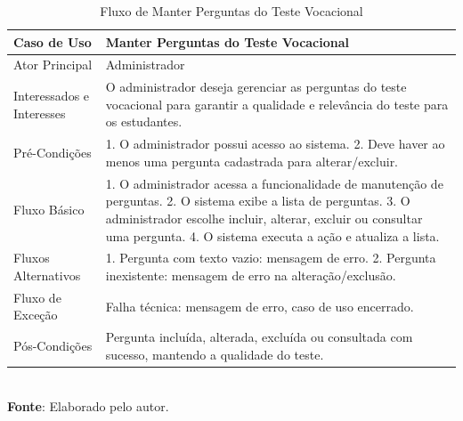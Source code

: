 \newpage
\begin{table}[h!]
\centering
\caption{Fluxo de Manter Perguntas do Teste Vocacional}
\begin{tabular}{|m{4cm}|m{11cm}|}
\hline
\textbf{Caso de Uso}   & \textbf{Manter Perguntas do Teste Vocacional} \\
\hline
Ator Principal & Administrador\\
\hline
Interessados e Interesses & O administrador deseja gerenciar as perguntas do teste vocacional para garantir a qualidade e relevância do teste para os estudantes. \\
\hline
Pré-Condições & 

1. O administrador possui acesso ao sistema.
2. Deve haver ao menos uma pergunta cadastrada para alterar/excluir. \\
\hline
Fluxo Básico & 

1. O administrador acessa a funcionalidade de manutenção de perguntas.
2. O sistema exibe a lista de perguntas.
3. O administrador escolhe incluir, alterar, excluir ou consultar uma pergunta.
4. O sistema executa a ação e atualiza a lista.
\\
\hline
Fluxos Alternativos & 

1. Pergunta com texto vazio: mensagem de erro.
2. Pergunta inexistente: mensagem de erro na alteração/exclusão.
\\
\hline
Fluxo de Exceção & Falha técnica: mensagem de erro, caso de uso encerrado. \\
\hline
Pós-Condições & Pergunta incluída, alterada, excluída ou consultada com sucesso, mantendo a qualidade do teste.\\
\hline
\end{tabular}
\label{table:casos-de-uso}
\\[1ex]
\footnotesize \textbf{Fonte}: Elaborado pelo autor.
\end{table}

